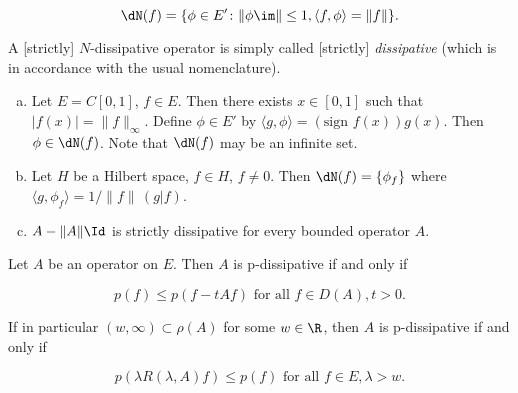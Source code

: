 \begin{equation}\label{eq:a2-2.6}
\dN(f) = \{\phi \in E' \colon \|\phi\im\|\leq 1, \langle f,\phi \rangle = \|f\|\}.
\end{equation}

A [strictly] $N$-dissipative operator is simply called [strictly] \emph{dissipative} (which is in accordance with the usual nomenclature).
\begin{example}\label{ex:a2-2.2} 
\begin{enumerate}[a)]
\item \label{ex:a2-2.2.1}
Let $E = C[0,1]$, $f \in E$.
Then there exists $x \in [0,1]$ such that $|f(x)| = \|f\|_{\infty}$.
Define $\phi \in E'$ by $\langle g,\phi \rangle = (\text{sign } f(x))g(x)$.
Then $\phi \in \dN(f)$.
Note that $\dN(f)$ may be an infinite set.
\item \label{ex:a2-2.2.2}
Let $H$ be a Hilbert space, $f \in H$, $f \neq 0$.
Then  $\dN(f) = \{\phi_{f}\}$ where $\langle g,\phi_{f} \rangle = 1/\|f\|\,(g|f)$.
\item \label{ex:a2-2.2.3}
$A - \|A\|\Id$ is strictly dissipative for every bounded operator $A$.
\end{enumerate}
\end{example}
\begin{proposition}\label{prop:a2-2.3}
Let $A$ be an operator on $E$.
Then $A$ is p-dissipative if and only if

\begin{equation} \label{eq:a2-2.7}
p(f) \leq p(f - tAf) \text{ for all } f \in D(A), t > 0.
\end{equation}

If in particular $(w,\infty) \subset \rho(A)$ for some $w \in \R$, then $A$ is p-dissipative if and only if

\begin{equation}\label{eq:a2-2.8}
p(\lambda R(\lambda,A)f) \leq p(f) \text{ for all } f \in E, \lambda > w.
\end{equation}
\end{proposition}

